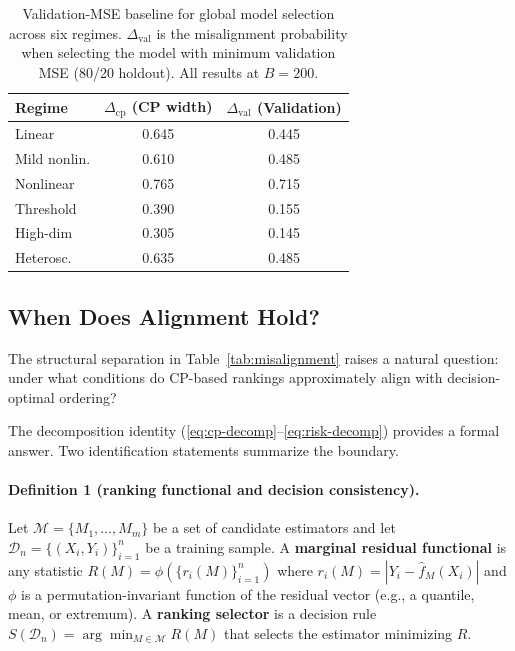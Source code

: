 \documentclass[a4paper,11pt]{article}
\begin{document}
\begin{table}[t]
    \centering
    \caption{Validation-MSE baseline for global model selection across six regimes. $\Delta_{\text{val}}$ is the misalignment probability when selecting the model with minimum validation MSE (80/20 holdout). All results at $B=200$.}
    \label{tab:val-baseline}
    \begin{tabular}{lcc}
        \toprule
        Regime & $\Delta_{\text{cp}}$ (CP width) & $\Delta_{\text{val}}$ (Validation) \\
        \midrule
        Linear       & 0.645 & 0.445 \\
        Mild nonlin.   & 0.610 & 0.485 \\
        Nonlinear    & 0.765 & 0.715 \\
        Threshold    & 0.390 & 0.155 \\
        High-dim     & 0.305 & 0.145 \\
        Heterosc.    & 0.635 & 0.485 \\
        \bottomrule
    \end{tabular}
\end{table}

\subsection{When Does Alignment Hold?}
\label{sec:boundary}

The structural separation in Table~\ref{tab:misalignment} raises a natural question: under what conditions do CP-based rankings approximately align with decision-optimal ordering?

The decomposition identity (\eqref{eq:cp-decomp}--\eqref{eq:risk-decomp}) provides a formal answer. Two identification statements summarize the boundary.

\paragraph{Definition 1 (ranking functional and decision consistency).}
Let $\mathcal{M} = \{M_1, \ldots, M_m\}$ be a set of candidate estimators and let $\mathcal{D}_n = \{(X_i, Y_i)\}_{i=1}^n$ be a training sample. A \textbf{marginal residual functional} is any statistic $R(M) = \phi(\{r_i(M)\}_{i=1}^n)$ where $r_i(M) = |Y_i - \hat{f}_M(X_i)|$ and $\phi$ is a permutation-invariant function of the residual vector (e.g., a quantile, mean, or extremum). A \textbf{ranking selector} is a decision rule $S(\mathcal{D}_n) = \arg\min_{M \in \mathcal{M}} R(M)$ that selects the estimator minimizing $R$.
\end{document}
